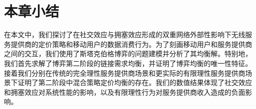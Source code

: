 \section{本章小结}\label{sec:tvtcon}
在本文中，我们探讨了在社交效应与拥塞效应形成的双重网络外部性影响下无线服务提供商的定价策略和移动用户的数据消费行为。为了刻画移动用户和服务提供商之间的交互，我们使用了斯塔克伯格博弈的问题建模并分析了其均衡解。特别地，我们首先求解了博弈第二阶段的链接需求均衡，并证明了博弈均衡的唯一性特征。接着我们分别在传统的完全理性服务提供商场景和更实际的有限理性服务提供商场景下证明了第二阶段中混合策略定价均衡的存在。我们的数值结果体现了社交效应和拥塞效应对系统性能的影响，以及有限理性行为对服务提供商收入造成的负面影响。

